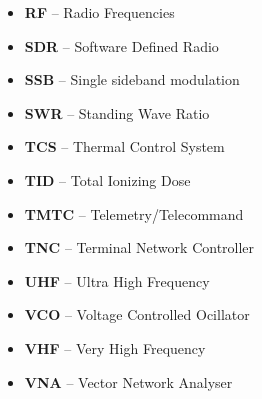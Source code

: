 \begin{itemize}
    \item    \textbf{RF}       --    Radio Frequencies
    \item    \textbf{SDR}      --    Software Defined Radio
    \item    \textbf{SSB}      --    Single sideband modulation
    \item    \textbf{SWR}      --    Standing Wave Ratio
    \item    \textbf{TCS}      --    Thermal Control System
    \item    \textbf{TID}      --    Total Ionizing Dose
    \item    \textbf{TMTC}      --    Telemetry/Telecommand
    \item    \textbf{TNC}      --    Terminal Network Controller
    \item    \textbf{UHF}      --    Ultra High Frequency
    \item    \textbf{VCO}      --    Voltage Controlled Ocillator
    \item    \textbf{VHF}      --    Very High Frequency
    \item    \textbf{VNA}      --    Vector Network Analyser
\end{itemize}
